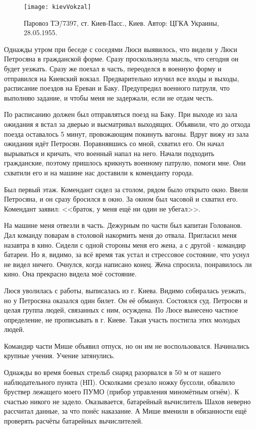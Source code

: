 \begin{wrapfigure}{O}{.4\textwidth}
\centering
\texttt{[image: kievVokzal]}
\caption{Паровоз ТЭ\=/7397, ст. Киев-Пасс., Киев. Автор: ЦГКА Украины, 28.05.1955.}
\label{fig:kievVokzal}
\end{wrapfigure}

Однажды утром при беседе с соседями Люси выявилось, что видели у Люси Петросяна в гражданской форме. Сразу проскользнула мысль, что сегодня он будет уезжать. Сразу же поехал в часть, переоделся в военную форму и отправился на Киевский вокзал. Предварительно изучил все входы и выходы, расписание поездов на Ереван и Баку. Предупредил военного патруля, что выполняю задание, и чтобы меня не задержали, если не отдам честь. 

По расписанию должен был отправляться поезд на Баку. При выходе из зала ожидания я встал за дверью и высматривал выходящих. Объявили, что до отхода поезда оставалось 5 минут, провожающим покинуть вагоны. Вдруг вижу из зала ожидания идёт Петросян. Поравнявшись со мной, схватил его. Он начал вырываться и кричать, что военный напал на него. Начали подходить гражданские, поэтому пришлось крикнуть военному патрулю, помоги мне. Они схватили его и на машине нас доставили к коменданту города. 

Был первый этаж. Комендант сидел за столом, рядом было открыто окно. Ввели Петросяна, и он сразу бросился в окно. За окном был часовой и схватил его. Комендант заявил: <<браток, у меня ещё ни один не убегал>>. 

На машине меня отвезли в часть. Дежурным по части был капитан Голованов. Дал команду поварам в столовой накормить меня до отвала. Пригласил меня назавтра в кино. Сидели с одной стороны меня его жена, а с другой - командир батареи. Но я, видимо, за всё время так устал и стрессовое состояние, что уснул не видел ничего. Очнулся, когда написано конец. Жена спросила, понравилось ли кино. Она прекрасно видела моё состояние. 

Люся уволилась с работы, выписалась из г. Киева. Видимо собиралась уезжать, но у Петросяна оказался один билет. Он её обманул. Состоялся суд. Петросян и целая группа людей, связанных с ним, осуждена. По Люсе вынесено частное определение, не прописывать в г. Киеве. Такая участь постигла этих молодых людей.

Командир части Мише объявил отпуск, но он им не воспользовался. Начинались крупные учения. Учение затянулись.

Однажды во время боевых стрельб снаряд разорвался в 50 м от нашего наблюдательного пункта (НП). Осколками срезало ножку буссоли, обвалило бруствер лежащего моего ПУМО (прибор управления миномётным огнём). К счастью никого не задело. Оказывается, батарейный вычислитель Шахов неверно рассчитал данные, за что понёс наказание. А Мише вменили в обязанности ещё проверять расчёты батарейных вычислителей. 

